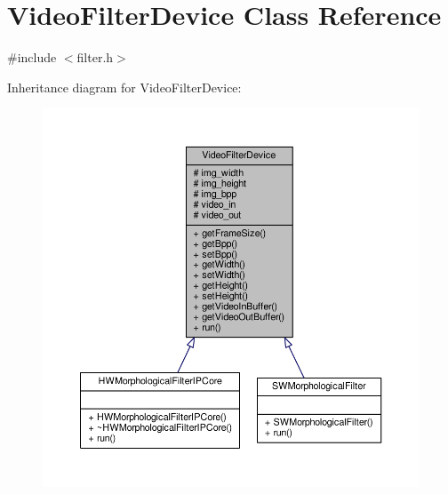 \hypertarget{classVideoFilterDevice}{}\section{Video\+Filter\+Device Class Reference}
\label{classVideoFilterDevice}


{\ttfamily \#include $<$filter.\+h$>$}



Inheritance diagram for Video\+Filter\+Device\+:
\nopagebreak
\begin{figure}[H]
\begin{center}
\leavevmode
\includegraphics[width=350pt]{classVideoFilterDevice__inherit__graph}
\end{center}
\end{figure}


